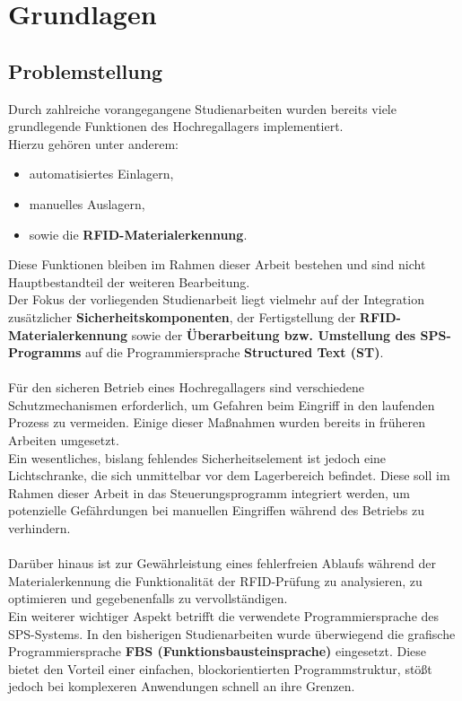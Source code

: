 
\section{Grundlagen}
\label{cha: Grundlagen}
\subsection{Problemstellung}
Durch zahlreiche vorangegangene Studienarbeiten wurden bereits viele grundlegende Funktionen des Hochregallagers implementiert.\\
Hierzu gehören unter anderem:
\begin{itemize}
	\item automatisiertes Einlagern,
	\item manuelles Auslagern,
	\item sowie die \textbf{RFID-Materialerkennung}.
\end{itemize}
Diese Funktionen bleiben im Rahmen dieser Arbeit bestehen und sind nicht Hauptbestandteil der weiteren Bearbeitung.\\
Der Fokus der vorliegenden Studienarbeit liegt vielmehr auf der Integration zusätzlicher \textbf{Sicherheitskomponenten}, der Fertigstellung der \textbf{RFID-Materialerkennung} sowie der \textbf{Überarbeitung bzw. Umstellung des SPS-Programms} auf die Programmiersprache \textbf{Structured Text (ST)}.\\\\
Für den sicheren Betrieb eines Hochregallagers sind verschiedene Schutzmechanismen erforderlich, um Gefahren beim Eingriff in den laufenden Prozess zu vermeiden. Einige dieser Maßnahmen wurden bereits in früheren Arbeiten umgesetzt.\\
Ein wesentliches, bislang fehlendes Sicherheitselement ist jedoch eine Lichtschranke, die sich unmittelbar vor dem Lagerbereich befindet. Diese soll im Rahmen dieser Arbeit in das Steuerungsprogramm integriert werden, um potenzielle Gefährdungen bei manuellen Eingriffen während des Betriebs zu verhindern.\\\\
Darüber hinaus ist zur Gewährleistung eines fehlerfreien Ablaufs während der Materialerkennung die Funktionalität der RFID-Prüfung zu analysieren, zu optimieren und gegebenenfalls zu vervollständigen.\\
Ein weiterer wichtiger Aspekt betrifft die verwendete Programmiersprache des SPS-Systems. In den bisherigen Studienarbeiten wurde überwiegend die grafische Programmiersprache \textbf{FBS (Funktionsbausteinsprache)} eingesetzt. Diese bietet den Vorteil einer einfachen, blockorientierten Programmstruktur, stößt jedoch bei komplexeren Anwendungen schnell an ihre Grenzen.\\

